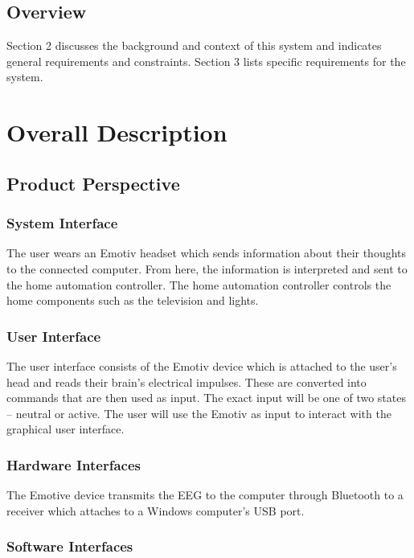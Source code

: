 \documentclass{article}
\begin{document}
\subsection{Overview}

Section 2 discusses the background and context of this system and indicates
general requirements and constraints. Section 3 lists specific requirements
for the system.

\newpage

\section{Overall Description}

\subsection{Product Perspective}

\subsubsection{System Interface}

The user wears an Emotiv headset which sends information about their thoughts to the connected computer. From here, the information is interpreted and sent to the home automation controller. The home automation controller controls the home components such as the television and lights. 

\subsubsection{User Interface}

The user interface consists of the Emotiv device which is attached to the user's head and reads their brain's electrical impulses. These are converted into commands that are then used as input. The exact input will be one of two states – neutral or active. The user will use the Emotiv as input to interact with the graphical user interface.

\subsubsection{Hardware Interfaces}

The Emotive device transmits the EEG to the computer through Bluetooth to a receiver which attaches to a Windows computer's USB port.

\subsubsection{Software Interfaces}
\end{document}
